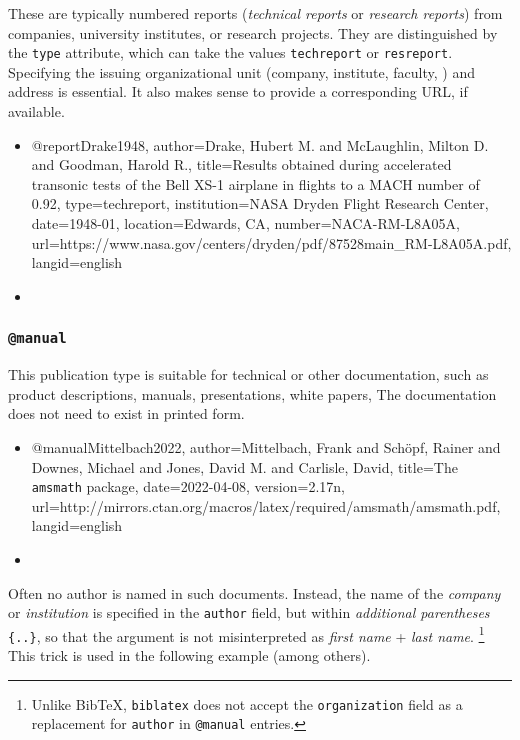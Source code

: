 These are typically numbered reports (\emph{technical reports} or \emph{research
reports}) from companies, university institutes, or research projects. They are
distinguished by the \texttt{type} attribute, which can take the values
\texttt{techreport} or \texttt{resreport}. Specifying the issuing organizational
unit (company, institute, faculty, \etc) and address is essential. It also makes
sense to provide a corresponding URL, if available.
%
\begin{itemize}
\item[]
\begin{GenericCode}[numbers=none]
@report{Drake1948,
  author={Drake, Hubert M. and McLaughlin, Milton D. and Goodman, Harold R.},
  title={Results obtained during accelerated transonic tests of the {Bell} {XS-1} airplane in flights to a {MACH} number of 0.92},
  type={techreport},
  institution={NASA Dryden Flight Research Center},
  date={1948-01},
  location={Edwards, CA},
  number={NACA-RM-L8A05A},
  url={https://www.nasa.gov/centers/dryden/pdf/87528main_RM-L8A05A.pdf},
  langid={english}
}
\end{GenericCode}
\item[\cite{Drake1948}] 
\end{itemize}


\subsubsection{\texttt{\bfseries @manual}}
\label{sec:@manual}

This publication type is suitable for technical or other documentation, such as
product descriptions, manuals, presentations, white papers, \etc The
documentation does not need to exist in printed form.
%
\begin{itemize}
\item[]
\begin{GenericCode}[numbers=none]
@manual{Mittelbach2022,
  author={Mittelbach, Frank and Schöpf, Rainer and Downes, Michael and Jones, David M. and Carlisle, David},
  title={The \texttt{amsmath} package},
  date={2022-04-08},
  version={2.17n},
  url={http://mirrors.ctan.org/macros/latex/required/amsmath/amsmath.pdf},
  langid={english}
}
\end{GenericCode}
\item[\cite{Mittelbach2022}] 
\end{itemize}
%
Often no author is named in such documents. Instead, the name of the
\emph{company} or \emph{institution} is specified in the \texttt{author} field,
but within \emph{additional parentheses} \texttt{\{..\}}, so that the
argument is not misinterpreted as \emph{first name} + \emph{last name}.%
\footnote{Unlike BibTeX, \texttt{biblatex} does not accept the
\texttt{organization} field as a replacement for \texttt{author} in
\texttt{@manual} entries.}
This trick is used in the following example (among others).

